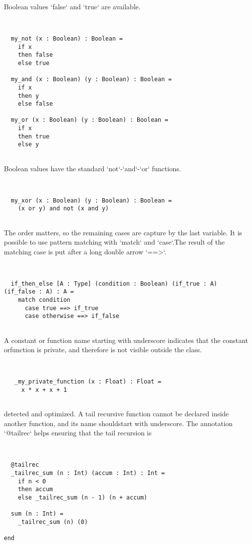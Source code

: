 \documentclass[12pt,a4paper]{article}
\begin{document}
Boolean values `false` and `true` are available. 


\begin{lstlisting}


  my_not (x : Boolean) : Boolean =
    if x
    then false
    else true

  my_and (x : Boolean) (y : Boolean) : Boolean =
    if x
    then y
    else false

  my_or (x : Boolean) (y : Boolean) : Boolean =
    if x
    then true
    else y


\end{lstlisting}

Boolean values have the standard `not`-`and`-`or` functions. 


\begin{lstlisting}


  my_xor (x : Boolean) (y : Boolean) : Boolean =
    (x or y) and not (x and y)


\end{lstlisting}

The order matters, so the remaining cases are capture by the last variable. It is possible to use pattern matching with `match` and `case`.The result of the matching case is put after a long double arrow `==>`.


\begin{lstlisting}


  if_then_else [A : Type] (condition : Boolean) (if_true : A) (if_false : A) : A =
    match condition
      case true ==> if_true
      case otherwise ==> if_false


\end{lstlisting}

A constant or function name starting with underscore indicates that the constant orfunction is private, and therefore is not visible outside the class. 


\begin{lstlisting}


   _my_private_function (x : Float) : Float =
     x * x + x + 1


\end{lstlisting}

detected and optimized. A tail recursive function cannot be declared inside another function, and its name shouldstart with underscore. The annotation `@tailrec` helps ensuring that the tail recursion is


\begin{lstlisting}


  @tailrec
  _tailrec_sum (n : Int) (accum : Int) : Int =
    if n < 0
    then accum
    else _tailrec_sum (n - 1) (n + accum)

  sum (n : Int) =
    _tailrec_sum (n) (0)

end


\end{lstlisting}
\end{document}
